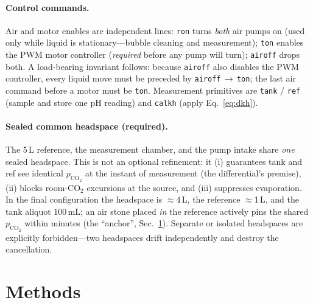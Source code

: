 \documentclass[11pt]{article}
\newcommand{\co}{\ensuremath{\mathrm{CO_2}}}
\newcommand{\pco}{\ensuremath{p_{\mathrm{CO_2}}}}
\begin{document}
\paragraph{Control commands.} Air and motor enables are independent lines:
\texttt{ron} turns \emph{both} air pumps on (used only while liquid is
stationary---bubble cleaning and measurement); \texttt{ton} enables the PWM
motor controller (\emph{required} before any pump will turn); \texttt{airoff}
drops both. A load-bearing invariant follows: because \texttt{airoff} also
disables the PWM controller, every liquid move must be preceded by
\texttt{airoff}\,$\rightarrow$\,\texttt{ton}; the last air command before a
motor must be \texttt{ton}. Measurement primitives are \texttt{tank} / \texttt{ref}
(sample and store one pH reading) and \texttt{calkh} (apply
Eq.~\eqref{eq:dkh}).

\paragraph{Sealed common headspace (required).} The 5\,L reference, the
measurement chamber, and the pump intake share \emph{one} sealed headspace.
This is not an optional refinement: it (i) guarantees tank and ref see identical
\pco{} at the instant of measurement (the differential's premise), (ii) blocks
room-\co{} excursions at the source, and (iii) suppresses evaporation. In the
final configuration the headspace is $\approx$4\,L, the reference $\approx$1\,L,
and the tank aliquot $100\,\mathrm{mL}$; an air stone placed \emph{in} the
reference actively pins the shared \pco{} within minutes (the
``anchor'', Sec.~\ref{sec:methods}). Separate or isolated headspaces are
explicitly forbidden---two headspaces drift independently and destroy the
cancellation.

\section{Methods}\label{sec:methods}
\end{document}
